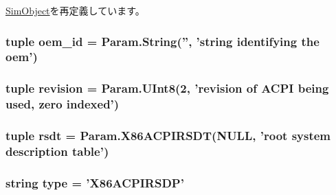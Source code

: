 \hyperlink{classm5_1_1SimObject_1_1SimObject_a17da7064bc5c518791f0c891eff05fda}{SimObject}を再定義しています。\hypertarget{classACPI_1_1X86ACPIRSDP_a92058ac009c691aede73e4bf13dbbb94}{
\subsubsection[{oem\_\-id}]{\setlength{\rightskip}{0pt plus 5cm}tuple {\bf oem\_\-id} = Param.String('', 'string identifying the oem')}}
\label{classACPI_1_1X86ACPIRSDP_a92058ac009c691aede73e4bf13dbbb94}
\hypertarget{classACPI_1_1X86ACPIRSDP_aa5f21ab34557fa5c1d83479fc4e19d4f}{
\subsubsection[{revision}]{\setlength{\rightskip}{0pt plus 5cm}tuple {\bf revision} = Param.UInt8(2, '{\bf revision} of ACPI being used, zero indexed')}}
\label{classACPI_1_1X86ACPIRSDP_aa5f21ab34557fa5c1d83479fc4e19d4f}
\hypertarget{classACPI_1_1X86ACPIRSDP_ab98cff471d0812ee1b505d0878958ff0}{
\subsubsection[{rsdt}]{\setlength{\rightskip}{0pt plus 5cm}tuple {\bf rsdt} = Param.X86ACPIRSDT(NULL, 'root system description table')}}
\label{classACPI_1_1X86ACPIRSDP_ab98cff471d0812ee1b505d0878958ff0}
\hypertarget{classACPI_1_1X86ACPIRSDP_acce15679d830831b0bbe8ebc2a60b2ca}{
\subsubsection[{type}]{\setlength{\rightskip}{0pt plus 5cm}string {\bf type} = '{\bf X86ACPIRSDP}'}}
\label{classACPI_1_1X86ACPIRSDP_acce15679d830831b0bbe8ebc2a60b2ca}


